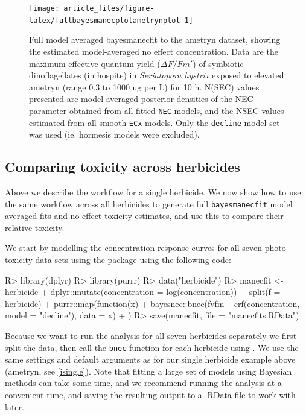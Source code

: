 \documentclass[
  shortnames]{jss}
\begin{document}
\begin{CodeChunk}
\begin{figure}[!ht]

{\centering \texttt{[image: article\_files/figure-latex/fullbayesmanecplotametrynplot-1]} 

}

\caption{Full model averaged bayesmanecfit to the ametryn dataset, showing the estimated model-averaged no effect concentration. Data are the maximum effective quantum yield ($\Delta F / Fm'$) of symbiotic dinoflagellates (in hospite) in \textit{Seriatopora hystrix} exposed to elevated ametryn (range 0.3 to 1000 ug per L) for 10 h. N(SEC) values presented are model averaged posterior densities of the NEC parameter obtained from all fitted \texttt{NEC} models, and the NSEC values estimated from all smooth \texttt{ECx} models. Only the \texttt{decline} model set was used (ie. hormesis models were excluded).}\label{fig:fullbayesmanecplotametrynplot}
\end{figure}
\end{CodeChunk}

\subsection[Comparing toxicity]{Comparing toxicity across herbicides}\label{iall}

Above we describe the workflow for a single herbicide. We now show how to use the same workflow across all herbicides to generate full \texttt{bayesmanecfit} model averaged fits and no-effect-toxicity estimates, and use this to compare their relative toxicity.

We start by modelling the concentration-response curves for all seven photo toxicity data sets using the  package using the following code:

\begin{CodeChunk}
\begin{CodeInput}
R> library(dplyr)
R> library(purrr)
R> data("herbicide")
R> manecfit <- herbicide %
+   dplyr::mutate(concentration = log(concentration)) %
+   split(f = ~ herbicide) %
+   purrr::map(function(x) {
+     bayesnec::bnec(fvfm ~ crf(concentration, model = "decline"), data = x)
+   })
R> save(manecfit, file = "manecfits.RData")
\end{CodeInput}
\end{CodeChunk}

Because we want to run the analysis for all seven herbicides separately we first split the data, then call the \texttt{bnec} function for each herbicide using . We use the same settings and default arguments as for our single herbicide example above (ametryn, see \ref{isingle}). Note that fitting a large set of models using Bayesian methods can take some time, and we recommend running the analysis at a convenient time, and saving the resulting output to a .RData file to work with later.
\end{document}

